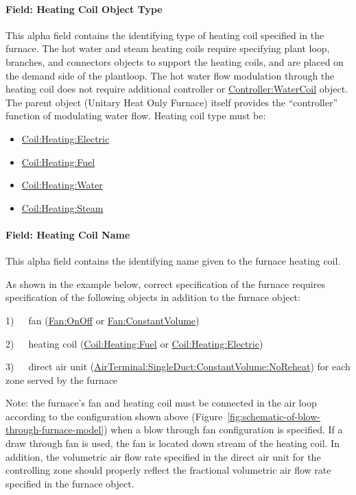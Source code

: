 \paragraph{Field: Heating Coil Object Type}\label{field-heating-coil-object-type-5}

This alpha field contains the identifying type of heating coil specified in the furnace. The hot water and steam heating coils require specifying plant loop, branches, and connectors objects to support the heating coils, and are placed on the demand side of the plantloop. The hot water flow modulation through the heating coil does not require additional controller or \hyperref[controllerwatercoil]{Controller:WaterCoil} object. The parent object (Unitary Heat Only Furnace) itself provides the ``controller'' function of modulating water flow. Heating coil type must be:

\begin{itemize}
\item
  \hyperref[coilheatingelectric]{Coil:Heating:Electric}
\item
  \hyperref[coilheatinggas-000]{Coil:Heating:Fuel}
\item
  \hyperref[coilheatingwater]{Coil:Heating:Water}
\item
  \hyperref[coilheatingsteam]{Coil:Heating:Steam}
\end{itemize}

\paragraph{Field: Heating Coil Name}\label{field-heating-coil-name-5}

This alpha field contains the identifying name given to the furnace heating coil.

As shown in the example below, correct specification of the furnace requires specification of the following objects in addition to the furnace object:

1)~~~fan (\hyperref[fanonoff]{Fan:OnOff} or \hyperref[fanconstantvolume]{Fan:ConstantVolume})

2)~~~heating coil (\hyperref[coilheatinggas-000]{Coil:Heating:Fuel} or \hyperref[coilheatingelectric]{Coil:Heating:Electric})

3)~~~direct air unit (\hyperref[airterminalsingleductconstantvolumenoreheat]{AirTerminal:SingleDuct:ConstantVolume:NoReheat}) for each zone served by the furnace

Note: the furnace's fan and heating coil must be connected in the air loop according to the configuration shown above (Figure~\ref{fig:schematic-of-blow-through-furnace-model}) when a blow through fan configuration is specified. If a draw through fan is used, the fan is located down stream of the heating coil. In addition, the volumetric air flow rate specified in the direct air unit for the controlling zone should properly reflect the fractional volumetric air flow rate specified in the furnace object.

